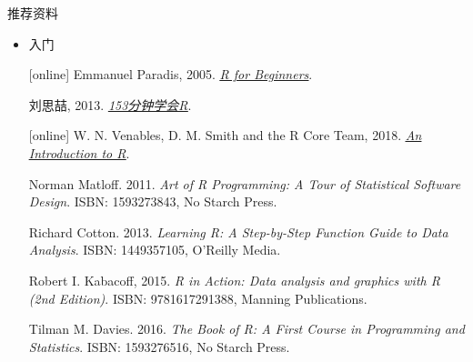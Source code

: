 

\begin{frame}[t]{推荐资料}{}
\begin{itemize}
\item 入门
\begin{thebibliography}{10} \footnotesize

[online]
Emmanuel Paradis, 2005. \href{https://cran.r-project.org/doc/contrib/Paradis-rdebuts_en.pdf}{\emph{\uline{R for Beginners}}}.

刘思喆, 2013. \href{https://cran.r-project.org/doc/contrib/Liu-FAQ.pdf}{\uline{\emph{153分钟学会R}}}.

[online]
W. N. Venables, D. M. Smith and the R Core Team, 2018. \href{https://cran.r-project.org/doc/manuals/r-release/R-intro.pdf}{\emph{\uline{An Introduction to R}}}.

{\beamertemplatebookbibitems
Norman Matloff. 2011. \emph{Art of R Programming: A Tour of Statistical Software Design}. ISBN: 1593273843, No Starch Press.}

{\beamertemplatebookbibitems
Richard Cotton. 2013. \emph{Learning R: A Step-by-Step Function Guide to Data Analysis}. ISBN: 1449357105, O'Reilly Media.}

{\beamertemplatebookbibitems
Robert I. Kabacoff, 2015. \emph{R in Action: Data analysis and graphics with R (2nd Edition)}. ISBN: 9781617291388, Manning Publications.}

{\beamertemplatebookbibitems
Tilman M. Davies. 2016. \emph{The Book of R: A First Course in Programming and Statistics}. ISBN: 1593276516, No Starch Press.}
  
\end{thebibliography}
\end{itemize}
\end{frame}

